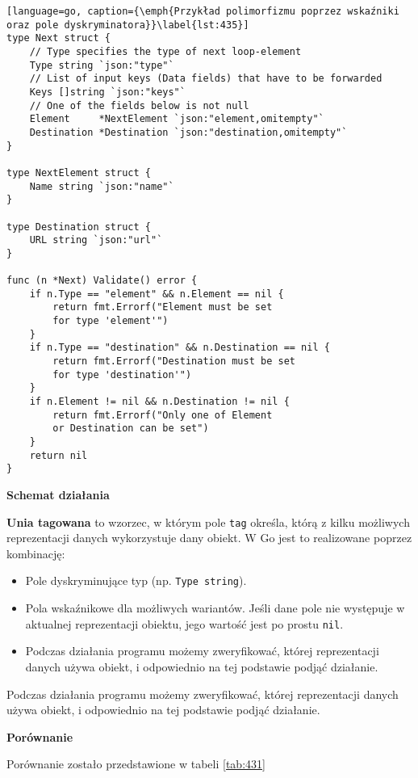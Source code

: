 \begin{lstlisting}[language=go, caption={\emph{Przykład polimorfizmu poprzez wskaźniki oraz pole dyskryminatora}}\label{lst:435}]
type Next struct {
	// Type specifies the type of next loop-element
	Type string `json:"type"`
	// List of input keys (Data fields) that have to be forwarded
	Keys []string `json:"keys"`
	// One of the fields below is not null
	Element     *NextElement `json:"element,omitempty"`
	Destination *Destination `json:"destination,omitempty"`
}

type NextElement struct {
	Name string `json:"name"`
}

type Destination struct {
	URL string `json:"url"`
}

func (n *Next) Validate() error {
	if n.Type == "element" && n.Element == nil {
		return fmt.Errorf("Element must be set 
        for type 'element'")
	}
	if n.Type == "destination" && n.Destination == nil {
		return fmt.Errorf("Destination must be set 
        for type 'destination'")
	}
	if n.Element != nil && n.Destination != nil {
		return fmt.Errorf("Only one of Element 
        or Destination can be set")
	}
	return nil
}
\end{lstlisting}

\textbf{Schemat działania}

\textbf{Unia tagowana} to wzorzec, w którym pole \texttt{tag} określa, którą z kilku możliwych reprezentacji danych wykorzystuje dany obiekt. W Go jest to realizowane poprzez kombinację:

\begin{itemize}
    \item Pole dyskryminujące typ (np. \texttt{Type string}).
    \item Pola wskaźnikowe dla możliwych wariantów. Jeśli dane pole nie występuje w aktualnej reprezentacji obiektu, jego wartość jest po prostu \texttt{nil}.
    \item Podczas działania programu możemy zweryfikować, której reprezentacji danych używa obiekt, i odpowiednio na tej podstawie podjąć działanie.
\end{itemize}

Podczas działania programu możemy zweryfikować, której reprezentacji danych używa obiekt, i odpowiednio na tej podstawie podjąć działanie.

\textbf{Porównanie}

Porównanie zostało przedstawione w tabeli \ref{tab:431}

